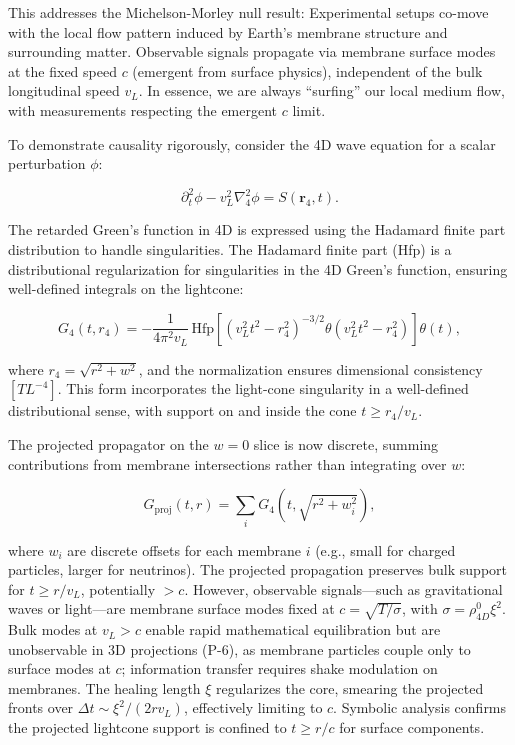 This addresses the Michelson-Morley null result: Experimental setups co-move with the local flow pattern induced by Earth's membrane structure and surrounding matter. Observable signals propagate via membrane surface modes at the fixed speed $c$ (emergent from surface physics), independent of the bulk longitudinal speed $v_L$. In essence, we are always ``surfing'' our local medium flow, with measurements respecting the emergent $c$ limit.

To demonstrate causality rigorously, consider the 4D wave equation for a scalar perturbation $\phi$:

\[
\partial_t^2 \phi - v_L^2 \nabla_4^2 \phi = S(\mathbf{r}_4, t).
\]

The retarded Green's function in 4D is expressed using the Hadamard finite part distribution to handle singularities. The Hadamard finite part (Hfp) is a distributional regularization for singularities in the 4D Green's function, ensuring well-defined integrals on the lightcone:

\[
G_4(t, r_4) = -\frac{1}{4 \pi^2 v_L} \, \text{Hfp} \left[ (v_L^2 t^2 - r_4^2)^{-3/2} \theta(v_L^2 t^2 - r_4^2) \right] \theta(t),
\]

where $r_4 = \sqrt{r^2 + w^2}$, and the normalization ensures dimensional consistency $[T L^{-4}]$. This form incorporates the light-cone singularity in a well-defined distributional sense, with support on and inside the cone $t \geq r_4 / v_L$.

The projected propagator on the $w=0$ slice is now discrete, summing contributions from membrane intersections rather than integrating over $w$:

\[
G_{\text{proj}}(t, r) = \sum_i G_4(t, \sqrt{r^2 + w_i^2}),
\]

where $w_i$ are discrete offsets for each membrane $i$ (e.g., small for charged particles, larger for neutrinos). The projected propagation preserves bulk support for $t \geq r / v_L$, potentially $>c$. However, observable signals---such as gravitational waves or light---are membrane surface modes fixed at $c = \sqrt{T / \sigma}$, with $\sigma = \rho_{4D}^0 \xi^2$. Bulk modes at $v_L > c$ enable rapid mathematical equilibration but are unobservable in 3D projections (P-6), as membrane particles couple only to surface modes at $c$; information transfer requires shake modulation on membranes. The healing length $\xi$ regularizes the core, smearing the projected fronts over $\Delta t \sim \xi^2 / (2 r v_L)$, effectively limiting to $c$. Symbolic analysis confirms the projected lightcone support is confined to $t \geq r / c$ for surface components.

